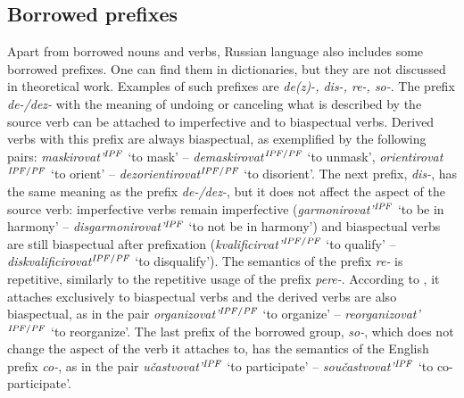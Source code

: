 \subsection{Borrowed prefixes}\label{subsection:perf:prefixes}
%
%
%
Apart from borrowed nouns and verbs, Russian language also includes some borrowed prefixes.  One can find them in dictionaries, but they are not discussed in theoretical work. Examples of such prefixes are \textit{de(z)-, dis-, re-, so-}. The prefix \textit{de-/dez-} with the meaning of undoing or canceling what is described by the source verb can be attached to imperfective and to biaspectual verbs. Derived verbs with this prefix are always biaspectual, as exemplified by the following pairs: \textit{maskirovat'}$^{\mathit{IPF}}$ `to mask' -- \textit{demaskirovat}$^{{\mathit{IPF}}/{\mathit{PF}}}$ `to unmask', \textit{orientirovat}$^{{\mathit{IPF}}/{\mathit{PF}}}$ `to orient' -- \textit{dezorientirovat}$^{{\mathit{IPF}}/{\mathit{PF}}}$ `to disorient'. The next prefix, \textit{dis-}, has the same meaning as the prefix \textit{de-/dez-}, but it does not affect the aspect of the source verb: imperfective verbs remain imperfective (\textit{garmonirovat'}$^{\mathit{IPF}}$ `to be in harmony' -- \textit{disgarmonirovat'}$^{\mathit{IPF}}$ `to not be in harmony') and biaspectual verbs are still biaspectual after prefixation (\textit{kvalificirvat'}$^{{\mathit{IPF}}/{\mathit{PF}}}$ `to qualify' -- \textit{diskvalificirovat}$^{{\mathit{IPF}}/{\mathit{PF}}}$ `to disqualify'). The semantics of the prefix \textit{re-} is repetitive, similarly to the repetitive usage of the prefix \textit{pere-}. According to \citet[369]{Shvedova:82}, it attaches exclusively to biaspectual verbs and the derived verbs are also biaspectual, as in the pair \textit{organizovat'}$^{{\mathit{IPF}}/{\mathit{PF}}}$  `to organize' -- \textit{reorganizovat'}$^{{\mathit{IPF}}/{\mathit{PF}}}$  `to reorganize'. The last prefix of the borrowed group, \textit{so-}, which does not change the aspect of the verb it attaches to, has the semantics of the English prefix \textit{co-}, as in the pair  \textit{u\v{c}astvovat'}$^{{\mathit{IPF}}}$  `to participate' -- \textit{sou\v{c}astvovat'}$^{{\mathit{IPF}}}$  `to co-participate'.

